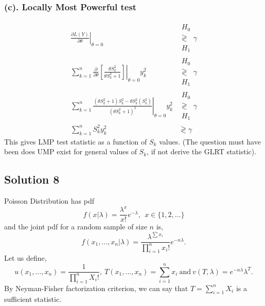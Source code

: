 \documentclass[a4paper,english,12pt]{article}
\begin{document}
\subsubsection*{(c). Locally Most Powerful test}
\begin{align*}
\left.\frac{\partial L(Y)}{\partial\theta}\right|_{\theta=0}& \substack{H_0\\\gtrless\\ H_1}\gamma\\
\left.\sum\limits_{k=1}^n \frac{\partial}{\partial\theta}\left[\frac{\theta S_k^2}{\theta S_k^2+1}\right]\right|_{\theta=0} y_k^2~& \substack{H_0\\\gtrless\\ H_1}\gamma\\
\left.\sum\limits_{k=1}^n\frac{(\theta S_k^2+1)S_k^2-\theta S_k^2(S_k^2)}{(\theta S_k^2+1)^2}\right|_{\theta=0}y_k^2&\substack{H_0\\\gtrless\\ H_1}\gamma\\
\sum\limits_{k=1}^nS_k^2y_k^2&\gtrless\gamma
\end{align*}
This gives LMP test statistic as a function of $S_k$ values.
(The question must have been does UMP exist for general values of $S_k$, if not derive the GLRT statistic).
\hypertarget{solution8}{\subsection*{Solution 8}}
Poisson Distribution has pdf
\begin{equation*}
f(x|\lambda)=\frac{\lambda^x}{x!}e^{-\lambda},~~x\in \{1,2,\dots\}
\end{equation*}
and the joint pdf for a random sample of size $n$ is,
\begin{equation*}
f(x_1,\dots,x_n|\lambda)=\frac{\lambda^{\sum x_i}}{\prod_{i=1}^n x_i!}e^{-n\lambda}.
\end{equation*}
Let us define,
\begin{equation*}
u(x_1,\dots,x_n)=\frac{1}{\prod_{i=1}^n X_i!}, \ T(x_1,\dots,x_n)=\sum_{i=1}^n  x_i~\mbox{and}~v(T,\lambda)=e^{-n\lambda}\lambda^T.
\end{equation*}
By Neyman-Fisher factorization criterion, we can say that $T=\sum_{i=1}^n X_i$ is a sufficient statistic.
\end{document}
